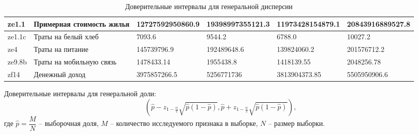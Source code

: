 \documentclass[12pt]{report}
\begin{document}
\begin{table}[H]
\begin{tabular}{|l|p{3cm}|l|l|l|l|}
    ze1.1   & Примерная стоимость жилья  & 12727592950860.9                                                                  & 19398997355121.3                                                                  & 11973428154879.1                                                                  & 20843916889527.8                                                                  \\ \hline
    ze1.1c  & Траты на белый хлеб        & 7093.6                                                                            & 9544.2                                                                            & 6788.0                                                                            & 10027.2                                                                           \\ \hline
    ze4     & Траты на питание           & 145739796.9                                                                       & 192489648.6                                                                       & 139824060.2                                                                       & 201576712.2                                                                       \\ \hline
    ze9.8b  & Траты на мобильную связь   & 1478433.14                                                                        & 1955438.8                                                                         & 1418139.55                                                                        & 2048256.78                                                                        \\ \hline
    zf14    & Денежный доход             & 3975857266.5                                                                      & 5256771736                                                                        & 3813904373.85                                                                     & 5505950906.6                                                                      \\ \hline
    \end{tabular}
    \caption{Доверительные интервалы для генеральной дисперсии}
    \end{table}
    Доверительные интервалы для генеральной доли:
    \[
        \left(\hat{p} - z_{1-\frac{\alpha}{2}}\sqrt{\hat{p}\left(1 - \hat{p}\right)}, \hat{p} + z_{1-\frac{\alpha}{2}} \sqrt{\hat{p}\left(1 - \hat{p}\right)}\right) ,
    \]
    где $\hat{p} = \dfrac{M}{N}$ -- выборочная доля, $M$ -- количество исследуемого признака в выборке, $N$ -- размер выборки.
\end{document}
